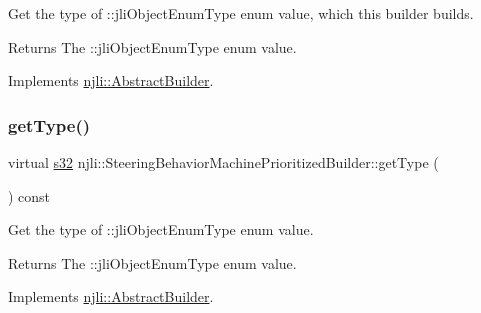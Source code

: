 Get the type of \+::jli\+Object\+Enum\+Type enum value, which this builder builds.

\begin{DoxyReturn}{Returns}
The \+::jli\+Object\+Enum\+Type enum value. 
\end{DoxyReturn}


Implements \mbox{\hyperlink{classnjli_1_1_abstract_builder_a0f2d344fcf697b167f4f2b1122b5fb33}{njli\+::\+Abstract\+Builder}}.

\mbox{\label{classnjli_1_1_steering_behavior_machine_prioritized_builder_a35da261aa788fdb9153c11e323996552}} 
\subsubsection{\texorpdfstring{get\+Type()}{getType()}}
{\footnotesize\ttfamily virtual \mbox{\hyperlink{_util_8h_aa62c75d314a0d1f37f79c4b73b2292e2}{s32}} njli\+::\+Steering\+Behavior\+Machine\+Prioritized\+Builder\+::get\+Type (\begin{DoxyParamCaption}{ }\end{DoxyParamCaption}) const\hspace{0.3cm}{\ttfamily [virtual]}}

Get the type of \+::jli\+Object\+Enum\+Type enum value.

\begin{DoxyReturn}{Returns}
The \+::jli\+Object\+Enum\+Type enum value. 
\end{DoxyReturn}


Implements \mbox{\hyperlink{classnjli_1_1_abstract_builder_abb4a8161cd71be12807fe85864b67050}{njli\+::\+Abstract\+Builder}}.

\mbox{\label{classnjli_1_1_steering_behavior_machine_prioritized_builder_a2673c76594a6d5678564c5f53e061902}} 
